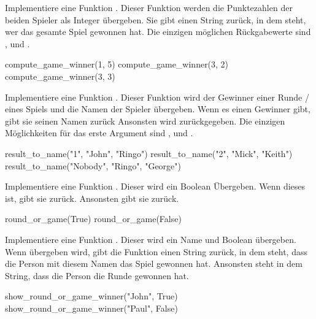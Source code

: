 \documentclass[a4paper, DIV = calc]{scrartcl}
\begin{document}
\begin{aufgabe} \noindent 
Implementiere eine Funktion . Dieser Funktion werden die Punktezahlen der beiden Spieler als Integer übergeben. Sie gibt einen String zurück, in dem steht, wer das gesamte Spiel gewonnen hat. Die einzigen möglichen Rückgabewerte sind ,  und .
\begin{pyconsole}
compute_game_winner(1, 5)
compute_game_winner(3,  2)
compute_game_winner(3,  3)
\end{pyconsole}

\end{aufgabe}



\begin{aufgabe} \noindent 
Implementiere eine Funktion . Dieser Funktion wird der Gewinner einer Runde / eines Spiels und die Namen der Spieler übergeben. Wenn es einen Gewinner gibt, gibt sie seinen Namen zurück Ansonsten wird  zurückgegeben. Die einzigen Möglichkeiten für das erste Argument sind ,  und .
\begin{pyconsole}
result_to_name("1", "John", "Ringo")
result_to_name("2",  "Mick", "Keith")
result_to_name("Nobody",  "Ringo", "George")
\end{pyconsole}

\end{aufgabe}


\begin{aufgabe} \noindent 
Implementiere eine Funktion . Dieser wird ein Boolean Übergeben. Wenn dieses  ist, gibt sie  zurück. Ansonsten gibt sie  zurück.
\begin{pyconsole}
round_or_game(True)
round_or_game(False)
\end{pyconsole}
\end{aufgabe}

\begin{aufgabe}
Implementiere eine Funktion . Dieser wird ein Name und Boolean übergeben. Wenn  übergeben wird, gibt die Funktion einen String zurück, in dem steht, dass die Person mit diesem Namen das Spiel gewonnen hat. Ansonsten steht in dem String, dass die Person die Runde gewonnen hat.

\begin{pyconsole}
show_round_or_game_winner("John", True)
show_round_or_game_winner("Paul", False)
\end{pyconsole}


\end{aufgabe}
\end{document}
